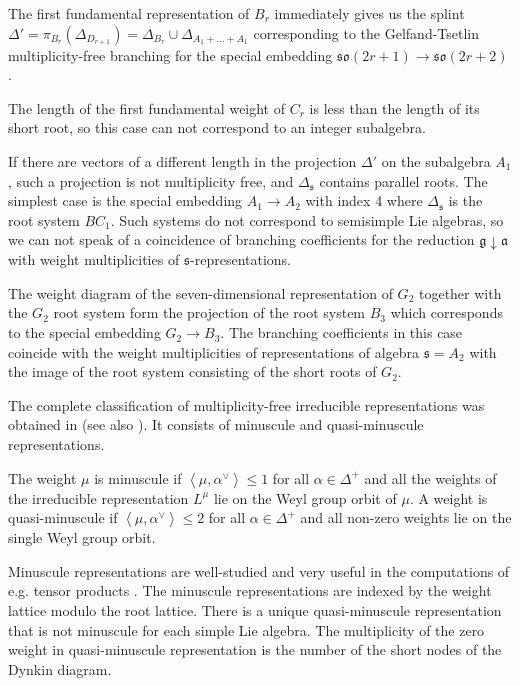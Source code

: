\documentclass[12pt]{article}
\newcommand{\gf}{\mathfrak{g}}
\newcommand{\af}{\mathfrak{a}}
\newcommand{\sfr}{\mathfrak{s}}
\begin{document}
The first fundamental representation of $B_{r}$ immediately gives us the splint $\Delta'=\pi_{B_{r}}\left(
\Delta_{D_{r+1}}\right) = \Delta_{B_{r}}\cup \Delta_{A_{1}+\dots+A_{1}}$ corresponding to the Gelfand-Tsetlin
multiplicity-free branching for the special embedding $\mathfrak{so}(2r+1)\to \mathfrak{so}(2r+2)$. 

The length of the first fundamental weight of  $C_{r}$ is less than the length of its short root, so
this case can not correspond to an integer subalgebra. 

If there are vectors of a different length in the projection $\Delta'$ on the subalgebra $A_{1}$, such a
projection is not multiplicity free, and $\Delta_{\sfr}$ contains parallel roots. The simplest case
is the special embedding $A_{1}\to A_{2}$ with index 4 where $\Delta_{\sfr}$ is the root system
$BC_{1}$. Such systems do not correspond to semisimple Lie algebras, so we can not speak of a
coincidence of branching coefficients for the reduction $\gf\downarrow \af$ with weight
multiplicities of $\sfr$-representations.

The weight diagram of the seven-dimensional representation of $G_{2}$ together with the $G_{2}$ root system
form the projection of the root system $B_{3}$ which corresponds to the special embedding 
$G_{2}\to B_{3}$. The branching coefficients in this case coincide with the weight multiplicities of
representations of algebra $\sfr=A_{2}$ with the image of the root system consisting of the short roots of
$G_{2}$. 

The complete classification of multiplicity-free irreducible representations was obtained in
\cite{howe1995perspectives} (see also \cite{stembridge2003multiplicity}). It consists of minuscule
and quasi-minuscule representations.

The weight $\mu$ is minuscule if $\left<\mu,\alpha^{\vee}\right>\leq 1$ for all $\alpha\in
\Delta^{+}$ and all the weights of the irreducible representation $L^{\mu}$ lie on the Weyl
group orbit of $\mu$. A weight is quasi-minuscule if $\left<\mu,\alpha^{\vee}\right>\leq 2$ for all
$\alpha\in \Delta^{+}$ and all non-zero weights lie on the single Weyl group orbit.

Minuscule representations are well-studied and very useful in the computations of e.g. tensor products
\cite{stembridge2003multiplicity,stembridge2001computational}. The minuscule representations are
indexed by the weight lattice modulo the root lattice. There is a unique quasi-minuscule
representation that is not minuscule for each simple Lie algebra. The multiplicity of the zero 
weight in quasi-minuscule representation is the number of the short nodes of the Dynkin diagram.
\end{document}
